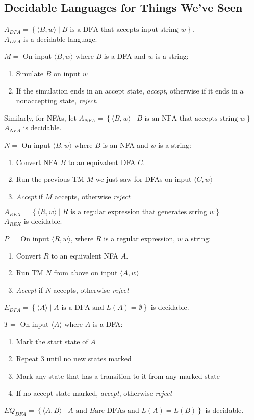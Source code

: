 \documentclass[12 pt]{article}
\begin{document}
\subsection{Decidable Languages for Things We've Seen}
$A_{DFA} = \left\{\langle B,w \rangle \mid B \text{ is a DFA that
    accepts input string } w\right\}$.
\\ $A_{DFA}$ is a decidable language.

$M =$ On input $\langle B,w \rangle$ where $B$ is a DFA and $w$ is a
string:
\begin{enumerate}
\item Simulate $B$ on input $w$
\item If the simulation ends in an accept state, \textit{accept},
  otherwise if it ends in a nonaccepting state, \textit{reject}.
\end{enumerate}
Similarly, for NFAs, let $A_{NFA} = \left\{\langle B,w \rangle \mid B
  \text{ is an NFA that accepts string }w\right\}$
\\ $A_{NFA}$ is decidable.

$N =$ On input $\langle B,w \rangle$ where $B$ is an NFA and $w$ is a
string:
\begin{enumerate}
\item Convert NFA $B$ to an equivalent DFA $C$.
\item Run the previous TM $M$ we just saw for DFAs on input $\langle
  C,w \rangle$
\item \textit{Accept} if $M$ accepts, otherwise \textit{reject}
\end{enumerate}
$A_{REX} = \left\{\langle R,w \rangle \mid R \text{ is a regular
    expression that generates string $w$}\right\}$
\\ $A_{REX}$ is decidable.

$P = $ On input $\langle R,w \rangle$, where $R$ is a regular
expression, $w$ a string:
\begin{enumerate}
\item Convert $R$ to an equivalent NFA $A$.
\item Run TM $N$ from above on input $\langle A,w \rangle$
\item \textit{Accept} if $N$ accepts, otherwise \textit{reject}
\end{enumerate}
$E_{DFA} = \left\{\langle A \rangle \mid A \text{ is a DFA and } L(A)
  = \emptyset\right\}$ is decidable.

$T =$ On input $\langle A \rangle$ where $A$ is a DFA:
\begin{enumerate}
\item Mark the start state of $A$
\item Repeat 3 until no new states marked
\item Mark any state that has a transition to it from any marked state
\item If no accept state marked, \textit{accept}, otherwise \textit{reject}
\end{enumerate}
$EQ_{DFA} = \left\{\langle A,B \rangle \mid A \text{ and } B \text{
    are DFAs and } L(A) = L(B)\right\}$ is decidable.
\end{document}
